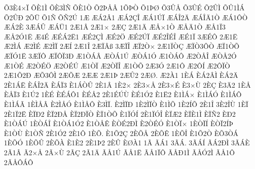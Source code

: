 {^^d53^^c84^^d7^^cf
^^d5^^c81^^cc
^^d5^^c83^^cc^^d1
^^d5^^c81^^d2
^^d52^^de^^c5^^c2
1^^d5^^de^^d2
^^d51^^de^^d8
^^d53^^db^^c5
^^d53^^db^^c9
^^d52^^db^^cc
^^d5^^db1^^cc^^c1
^^d52^^db^^d0
2^^d5^^dc
^^d51^^d1
^^d5^^d12^^da
1^^c6
^^c6^^c12^^c21
^^c6^^c12^^c7^^ce
^^c6^^c11^^da^^cf
^^c6^^c1^^ce2^^c4
^^c6^^c1^^ce^^c41^^d2
^^c6^^c11^^d4^^d2
^^c6^^c12^^c8
3^^c6^^c1^^db
^^c6^^c1^^dc1
2^^c61^^c2
2^^c61^^d7
2^^c6^^c7
2^^c61^^c4
^^c6^^c5^^d71^^d2
^^c6^^c5^^c41^^d2
^^c6^^c51^^cf3
^^c6^^c52^^d31^^cb
^^c64^^c9
^^c6^^c9^^c12^^cb1
^^c6^^c92^^c7^^cc
^^c6^^c92^^d6
^^c6^^c92^^da^^cf
^^c6^^c92^^ce^^c9^^ce
^^c6^^c91^^cf
3^^c6^^c9^^d4
2^^c61^^cb
^^c62^^cc^^c1
^^c62^^cc^^c9
^^c62^^cc^^cf
2^^c6^^cd
2^^c61^^ce
2^^c6^^cf^^c2^^df
3^^c6^^cf^^ce
^^c6^^cf2^^d2^^d7
2^^c61^^cf^^d2^^c7
^^c6^^cf^^d23^^d4^^d2
^^c6^^cf1^^d2^^d5
^^c6^^cf^^d31^^cb
3^^c6^^cf^^d4
^^c6^^cf^^d4^^cf3^^d0
^^c61^^d2^^c1^^c2
^^c6^^d2^^c11^^da
^^c6^^d2^^c11^^d3
^^c61^^d2^^c1^^d4
^^c62^^d2^^c5^^ce
^^c6^^d2^^c52^^d3
^^c61^^d2^^c9
^^c62^^d2^^c9^^d6
^^c62^^d2^^c9^^da
^^c61^^d2^^cf
^^c62^^d2^^cf^^ce
^^c61^^d2^^d5
2^^c63^^d3
2^^c61^^d4
^^c62^^d4^^cd
^^c62^^d4^^cf^^d2
2^^c61^^d52^^d0
^^c6^^d53^^d4^^cc
2^^c6^^d5^^c6
2^^c6^^c6
2^^c61^^de
2^^c6^^db2
2^^c6^^d8.
^^c62^^c01
1^^c8^^c1
^^c8^^c12^^c2^^cc
^^c8^^c12^^c4
2^^c81^^c1^^cb
^^c8^^c1^^ce2^^c4
^^c8^^c1^^cf3
^^c81^^c1^^d2^^db
2^^c81^^c2
1^^c82^^d7
2^^c83^^d7^^c5
2^^c83^^d7^^c9
^^c83^^d7^^d9
2^^c8^^c7
^^c83^^c42
1^^c8^^c5
^^c8^^c5^^cf3
^^c81^^da2
1^^c8^^c9
^^c8^^c9^^c1^^d41
^^c8^^c9^^c52
2^^c81^^c9^^da^^d9
^^c8^^c91^^d32
^^c81^^cb2
^^c81^^cc^^c1^^d7
^^c81^^cc^^c1^^d3
^^c81^^cc^^c1^^d4
^^c81^^cc^^c1^^c3
1^^c8^^cc^^c5^^c2
^^c82^^cc^^c5^^d3
^^c81^^cc^^c5^^d4
^^c83^^cc^^cf.
^^c82^^cc^^cf^^d0
1^^c82^^cc^^cf^^d2
^^c81^^cc^^d5
1^^c82^^cd^^d5
2^^c81^^ce
3^^c82^^ce^^d9
1^^c8^^cf
2^^c81^^cf2^^cb
^^c8^^cf^^d02
^^c8^^cf2^^d0^^c5
^^c8^^cf2^^d0^^cf^^d2
^^c8^^cf1^^d2^^d5
^^c81^^cf^^d3^^cd
2^^c81^^cf^^d3^^ce
^^c8^^cf^^c62
^^c8^^cf^^c81^^cc
^^c8^^cf^^d12
^^c8^^d02
^^c81^^d2^^c1^^da
1^^c8^^d2^^c1^^ce
^^c81^^d2^^c11^^d32
^^c81^^d2^^c5^^ca
^^c8^^d2^^c92^^d0^^cc
^^c82^^d2^^c9^^d3
^^c81^^d2^^cf^^d7
1^^c8^^d2^^cf^^cd
^^c8^^d2^^cf2^^cd^^de
^^c81^^d2^^d9
^^c81^^d2^^d1
2^^c81^^d32
2^^c81^^d4
1^^c8^^d5.
^^c81^^d52^^c7
2^^c8^^d5^^c5
2^^c8^^d5^^ca
1^^c8^^d5^^ce
^^c81^^d52^^d2
^^c8^^d53^^d2^^c1
1^^c8^^d5^^d3
1^^c8^^d5^^db
2^^c8^^d5^^c0
^^c81^^c82
2^^c81^^de2
2^^c8^^db
^^c8^^d8^^c01
1^^c3
^^c3^^c11
3^^c3^^c1.
3^^c3^^c1^^cd
^^c3^^c12^^d0^^cc
3^^c3^^c1^^c8
2^^c31^^c2
^^c32^^d7^^c5
2^^c3^^d7^^d9
2^^c3^^c7
2^^c31^^c4
^^c3^^c51^^da
^^c3^^c51^^cb
^^c3^^c51^^cf^^d4
^^c3^^c5^^d01^^cc
^^c3^^c5^^d32^^cc
^^c3^^c51^^d4
2^^c3^^c5^^d4^^c1^^d4
}
